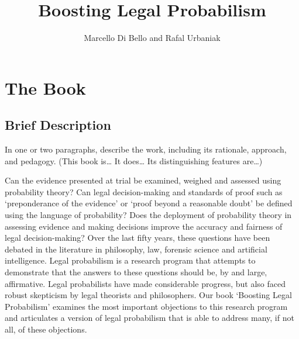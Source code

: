 \documentclass[
  10pt,
  dvipsnames,enabledeprecatedfontcommands]{scrartcl}
\title{Boosting Legal Probabilism}
\author{Marcello Di Bello and Rafal Urbaniak}
\date{}
\begin{document}
\maketitle

\hypertarget{the-book}{%
\section{The Book}\label{the-book}}

\hypertarget{brief-description}{%
\subsection{Brief Description}\label{brief-description}}

\footnotesize In one or two paragraphs, describe the work, including its
rationale, approach, and pedagogy. (This book is\ldots{} It does\ldots{}
Its distinguishing features are\ldots)

\normalsize

Can the evidence presented at trial be examined, weighed and assessed
using probability theory? Can legal decision-making and standards of
proof such as `preponderance of the evidence' or `proof beyond a
reasonable doubt' be defined using the language of probability? Does the
deployment of probability theory in assessing evidence and making
decisions improve the accuracy and fairness of legal decision-making?
Over the last fifty years, these questions have been debated in the
literature in philosophy, law, forensic science and artificial
intelligence. Legal probabilism is a research program that attempts to
demonstrate that the answers to these questions should be, by and large,
affirmative. Legal probabilists have made considerable progress, but
also faced robust skepticism by legal theorists and philosophers. Our
book `Boosting Legal Probabilism' examines the most important objections
to this research program and articulates a version of legal probabilism
that is able to address many, if not all, of these objections.
\end{document}
